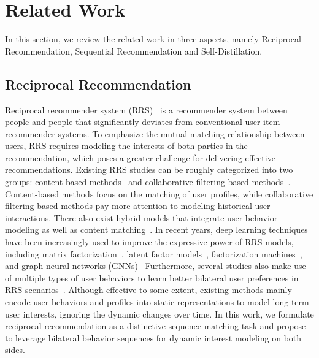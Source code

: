 \section{Related Work}
In this section, we review the related work in three aspects, namely Reciprocal Recommendation, Sequential Recommendation and Self-Distillation.

\subsection{Reciprocal Recommendation}
Reciprocal recommender system (RRS)~\cite{pizzato2010recon} is a recommender system between people and people that significantly deviates from conventional user-item recommender systems. 
To emphasize the mutual matching relationship between users, RRS requires modeling the interests of both parties in the recommendation, which poses a greater challenge for delivering effective recommendations.
Existing RRS studies can be roughly categorized into two groups: content-based methods~\cite{pizzato2010recon,alanazi2013people,tu2014online} and collaborative filtering-based methods~\cite{cai2012reciprocal,xia2015reciprocal}. Content-based methods focus on the matching of user profiles,
while collaborative filtering-based methods pay more attention to modeling historical user interactions. 
There also exist hybrid models that integrate user behavior modeling as well as content matching~\cite{akehurst2011ccr,yang2017combining,kleinerman2018optimally,hou2022leveraging}. 
In recent years, deep learning techniques have been increasingly used to improve the expressive power of RRS models, including matrix factorization~\cite{qu2018reciprocal}, latent factor models~\cite{neve2019latent}, factorization machines~\cite{yildirim2021bideepfm}, and graph neural networks (GNNs)~\cite{luo2020motif,yang2022modeling} 
Furthermore, several studies also make use of multiple types of user behaviors to learn better bilateral user preferences in RRS scenarios~\cite{le2019towards,fu2021beyond}. 
Although effective to some extent,
existing methods mainly encode user behaviors and profiles into static representations to model long-term user interests, ignoring the dynamic changes over time. In this work, we formulate reciprocal recommendation as a distinctive sequence matching task and propose to leverage bilateral behavior sequences for dynamic interest modeling on both sides. 


